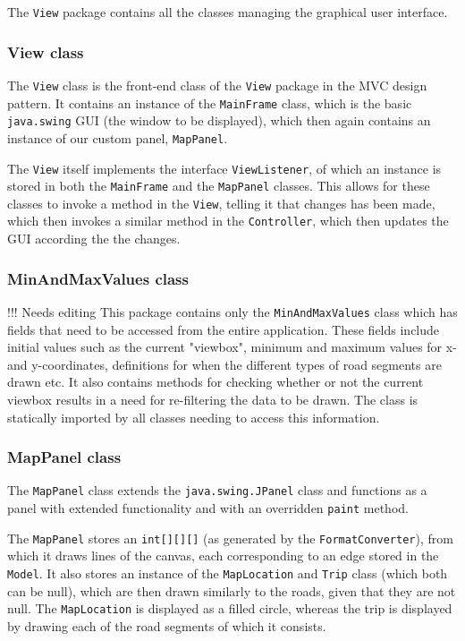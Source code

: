 The \texttt{View} package contains all the classes managing the graphical user interface.


\subsubsection{View class} %
The \texttt{View} class is the front-end class of the \texttt{View} package in the MVC design pattern. It contains an instance of the \texttt{MainFrame} class, which is the basic \texttt{java.swing} GUI (the window to be displayed), which then again contains an instance of our custom panel, \texttt{MapPanel}.

The \texttt{View} itself implements the interface \texttt{ViewListener}, of which an instance is stored in both the \texttt{MainFrame} and the \texttt{MapPanel} classes. This allows for these classes to invoke a method in the \texttt{View}, telling it that changes has been made, which then invokes a similar method in the \texttt{Controller}, which then updates the GUI according the the changes.

\subsubsection{MinAndMaxValues class}
!!! Needs editing
This package contains only the \texttt{MinAndMaxValues} class which has fields that need to be accessed from the entire application. These fields include initial values such as the current "viewbox", minimum and maximum values for x- and y-coordinates, definitions for when the different types of road segments are drawn etc. It also contains methods for checking whether or not the current viewbox results in a need for re-filtering the data to be drawn. The class is statically imported by all classes needing to access this information.

\subsubsection{MapPanel class} %
The \texttt{MapPanel} class extends the \texttt{java.swing.JPanel} class and functions as a panel with extended functionality and with an overridden \texttt{paint} method.

The \texttt{MapPanel} stores an \texttt{int[][][]} (as generated by the \texttt{FormatConverter}), from which it draws lines of the canvas, each corresponding to an edge stored in the \texttt{Model}. It also stores an instance of the \texttt{MapLocation} and \texttt{Trip} class (which both can be null), which are then drawn similarly to the roads, given that they are not null. The \texttt{MapLocation} is displayed as a filled circle, whereas the trip is displayed by drawing each of the road segments of which it consists.

